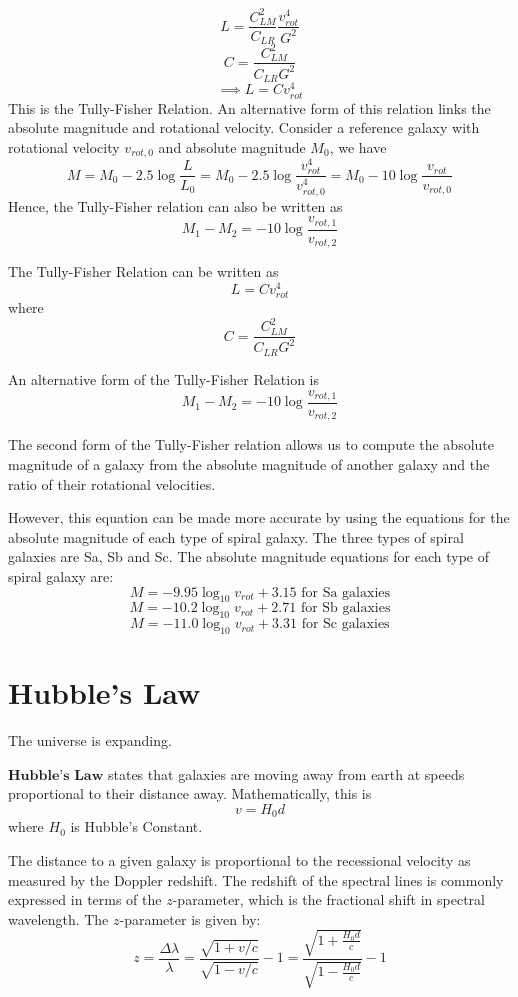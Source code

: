 \documentclass{article}
\theoremstyle{definition}
\begin{document}
$$L=\frac{C_{LM}^2}{C_{LR}}\frac{v_{rot}^4}{G^2}$$
$$C=\frac{C_{LM}^2}{C_{LR}G^2}$$
$$\implies L=Cv_{rot}^4$$
This is the Tully-Fisher Relation. An alternative form of this relation links the absolute magnitude and rotational velocity. Consider a reference galaxy with rotational velocity $v_{rot,0}$ and absolute magnitude $M_0$, we have 
$$M=M_0-2.5\log \frac{L}{L_0}=M_0-2.5\log \frac{v_{rot}^4}{v_{rot,0}^4}=M_0-10\log \frac{v_{rot}}{v_{rot,0}}$$
Hence, the Tully-Fisher relation can also be written as 
$$M_1-M_2=-10\log \frac{v_{rot,1}}{v_{rot,2}}$$
\begin{theorem}
    The Tully-Fisher Relation can be written as 
    $$L=Cv_{rot}^4$$
    where 
    $$C=\frac{C_{LM}^2}{C_{LR}G^2}$$
\end{theorem}
\begin{theorem}
    An alternative form of the Tully-Fisher Relation is 
    $$M_1-M_2=-10\log \frac{v_{rot,1}}{v_{rot,2}}$$
\end{theorem}
\begin{note}
    The second form of the Tully-Fisher relation allows us to compute the absolute magnitude of a galaxy from the absolute magnitude of another galaxy and the ratio of their rotational velocities.
\end{note}
\begin{note}
However, this equation can be made more accurate by using the equations for the absolute magnitude of each type of spiral galaxy. The three types of spiral galaxies are Sa, Sb and Sc. The absolute magnitude equations for each type of spiral galaxy are:
$$M=-9.95\log_{10}v_{rot}+3.15\text{ for Sa galaxies}$$
$$M=-10.2\log_{10}v_{rot}+2.71\text{ for Sb galaxies}$$
$$M=-11.0\log_{10}v_{rot}+3.31\text{ for Sc galaxies}$$
\end{note}
\newpage
\section{Hubble's Law}
The universe is expanding. 
\begin{definition}
    $\textbf{Hubble's Law}$ states that galaxies are moving away from earth at speeds proportional to their distance away. Mathematically, this is 
    $$v=H_0d$$
    where $H_0$ is Hubble's Constant.
\end{definition}
\begin{note}
    The distance to a given galaxy is proportional to the recessional velocity as measured by the Doppler redshift. The redshift of the spectral lines is commonly expressed in terms of the $z$-parameter, which is the fractional shift in spectral wavelength. The $z$-parameter is given by:
    $$z=\frac{\Delta\lambda}{\lambda}=\frac{\sqrt{1+v/c}}{\sqrt{1-v/c}}-1=\frac{\sqrt{1+\frac{H_0d}{c}}}{\sqrt{1-\frac{H_0d}{c}}}-1$$
\end{note}
\end{document}

